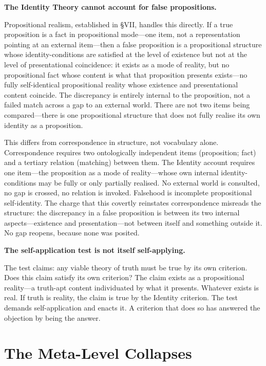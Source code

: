 \documentclass[11pt, oneside]{article}
\begin{document}
\bigskip
\noindent\textbf{The Identity Theory cannot account for false
propositions.}

\medskip\noindent
Propositional realism, established in \S VII, handles this directly. If
a true proposition is a fact in propositional mode---one item, not a
representation pointing at an external item---then a false proposition is
a propositional structure whose identity-conditions are satisfied at the
level of existence but not at the level of presentational coincidence: it
exists as a mode of reality, but no propositional fact whose content
is what that proposition presents exists---no fully self-identical
propositional reality whose existence and presentational content
coincide. The
discrepancy is entirely internal to the proposition, not a failed match
across a gap to an external world. There are not two items being
compared---there is one propositional structure that does not fully
realise its own identity as a proposition.

This differs from correspondence in structure, not vocabulary alone.
Correspondence requires two ontologically independent items (proposition;
fact) and a tertiary relation (matching) between them. The Identity
account requires one item---the proposition as a mode of reality---whose
own internal identity-conditions may be fully or only partially realised.
No external world is consulted, no gap is crossed, no relation is
invoked. Falsehood is incomplete propositional self-identity. The charge
that this covertly reinstates correspondence misreads the structure: the
discrepancy in a false proposition is between its two internal
aspects---existence and presentation---not between itself and something
outside it. No gap reopens, because none was posited.

\bigskip
\noindent\textbf{The self-application test is not itself self-applying.}

\medskip\noindent
The test claims: any viable theory of truth must be true by its own
criterion. Does this claim satisfy its own criterion? The claim exists as
a propositional reality---a truth-apt content individuated by what it
presents. Whatever exists is real. If truth is reality, the claim is true
by the Identity criterion. The test demands self-application and enacts
it. A criterion that does so has answered the objection by being the
answer.

\section{The Meta-Level Collapses}
\end{document}
